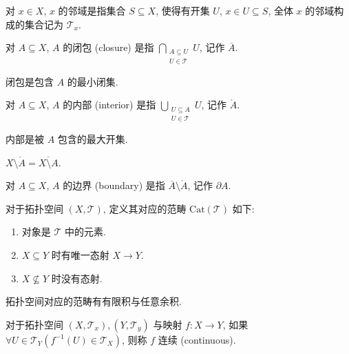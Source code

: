\begin{definition}[邻域]
    对 \(x \in X\), \(x\) 的邻域是指集合 \(S \subseteq X\), 使得有开集 \(U\), \(x \in U \subseteq S\),
    全体 \(x\) 的邻域构成的集合记为 \(\mathcal{T}_x\).
\end{definition}

\begin{definition}[闭包]
    对 \(A \subseteq X\), \(A\) 的闭包 (closure) 是指 \(\bigcap_{\substack{A \subseteq U \\ U \in \mathcal{T}}} U\), 记作 \(\overline{A}\).
\end{definition}

闭包是包含 \(A\) 的最小闭集.

\begin{definition}[内部]
    对 \(A \subseteq X\), \(A\) 的内部 (interior) 是指 \(\bigcup_{\substack{U \subseteq A \\ U \in \mathcal{T}}} U\), 记作 \(\mathring{A}\).
\end{definition}

内部是被 \(A\) 包含的最大开集.

\begin{corollary}
    \(X \setminus \mathring{A} = \overline{X \setminus A}\).
\end{corollary}

\begin{definition}[边界]
    对 \(A \subseteq X\), \(A\) 的边界 (boundary) 是指 \(\overline{A} \setminus \mathring{A}\), 记作 \(\partial A\).
\end{definition}

\begin{definition}
    \label {definition:topological space's category}
    对于拓扑空间 \((X,\mathcal{T})\), 定义其对应的范畴 \(\mathrm{Cat} (\mathcal{T})\) 如下:

    \begin{enumerate}
        \item 对象是 \(\mathcal{T}\) 中的元素.
        \item \(X \subseteq Y\) 时有唯一态射 \(X \to Y\).
        \item \(X \nsubseteq Y\) 时没有态射.
    \end{enumerate}
\end{definition}

\begin{lemma}
    拓扑空间对应的范畴有有限积与任意余积.
\end{lemma}

\begin{definition}
    对于拓扑空间 \((X,\mathcal{T}_x), (Y,\mathcal{T}_y)\) 与映射 \(f : X \to Y\),
    如果 \(\forall U \in \mathcal{T}_Y (f^{-1} (U) \in \mathcal{T}_X)\), 则称 \(f\) 连续 (continuous).
\end{definition}

